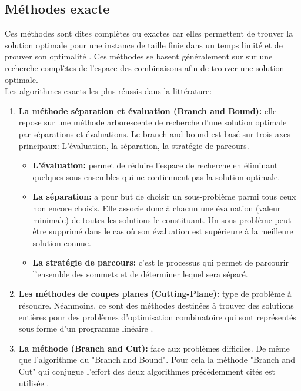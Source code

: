 \subsection{Méthodes exacte}
Ces méthodes sont dites complètes ou exactes car elles permettent de trouver la solution optimale pour une instance de taille finie dans un temps limité et de prouver son optimalité \cite{puchinger2005combining} . Ces méthodes se basent généralement sur sur une recherche complètes de l’espace des combinaisons afin de trouver une solution optimale.\\
Les algorithmes exacts les plus réussis dans la littérature: 


\begin{enumerate}[label=\alph*)]
	\item \textbf{La méthode séparation et évaluation (Branch and Bound):} elle repose sur une méthode arborescente de recherche d’une solution optimale par séparations et évaluations. Le branch-and-bound est basé sur trois axes principaux: L’évaluation, la séparation, la stratégie de parcours.
	\begin{itemize}
		\item \textbf{L’évaluation: } permet de réduire l’espace de recherche en éliminant quelques sous ensembles qui ne contiennent pas la solution optimale.
		\item \textbf{La séparation: } a pour but de choisir un sous-problème parmi tous ceux non encore choisis. Elle associe donc à chacun une évaluation (valeur minimale) de toutes les solutions le constituant. Un sous-problème peut être supprimé dans le cas où son évaluation est supérieure à la meilleure solution connue.
		\item \textbf{La stratégie de parcours: } c’est le processus qui permet de parcourir l’ensemble des sommets et de déterminer lequel sera séparé.
	\end{itemize}
	\item \textbf{Les méthodes de coupes planes (Cutting-Plane): }type de problème à résoudre. Néanmoins, ce sont des méthodes destinées à trouver des solutions entières pour des problèmes d’optimisation combinatoire qui sont représentés sous forme d’un programme linéaire \cite{schrijver1986theory} .
	\item \textbf{La méthode (Branch and Cut): }face aux problèmes difficiles. De même que l’algorithme du "Branch and Bound". Pour cela la méthode "Branch and Cut" qui conjugue l’effort des deux algorithmes précédemment cités est utilisée \cite{padberg1991branch,padberg1987optimization} .
\end{enumerate}

